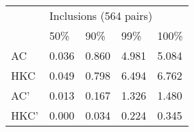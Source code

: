 \begin{tabular}{l|llll|}
\multirow{2}{*}{} & \multicolumn{4}{l|}{Inclusions (564 pairs)} \\ \cline{2-5}
                  & 50\%      & 90\%      & 99\%     & 100\%    \\ \hline
AC                & 0.036     & 0.860     & 4.981    & 5.084    \\
HKC               & 0.049     & 0.798     & 6.494    & 6.762    \\
AC'               & 0.013     & 0.167     & 1.326    & 1.480    \\
HKC'              & 0.000     & 0.034     & 0.224    & 0.345
\end{tabular}
